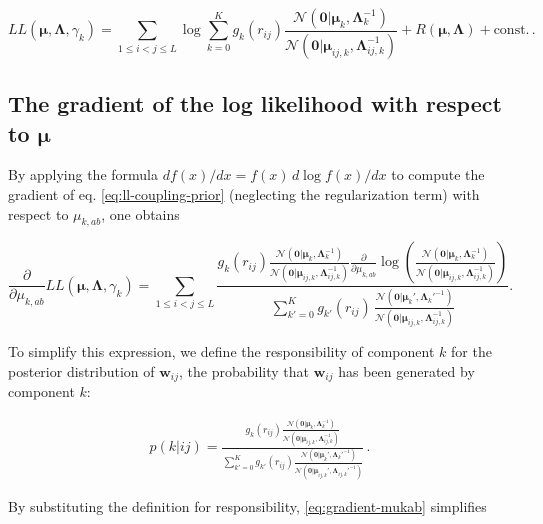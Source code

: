 \documentclass[12pt,a4paper,twoside]{book}
\newcommand{\Gauss}{\mathcal{N}}
\newcommand{\Lijk}{\mathbf{\Lambda}_{ij,k}}
\newcommand{\Lk}{\mathbf{\Lambda}_k}
\newcommand{\muijk}{\mathbf{\mu}_{ij,k}}
\newcommand{\muk}{\mathbf{\mu}_k}
\newcommand{\rij}{r_{ij}}
\newcommand{\wij}{\mathbf{w}_{ij}}
\theoremstyle{definition}
\theoremstyle{definition}
\theoremstyle{remark}
\begin{document}
\begin{equation}
    L\!L(\mathbf{\mu}, \mathbf{\Lambda}, \gamma_k) =  \sum_{1 \le i < j \le L}  \log \sum_{k=0}^K g_{k}(\rij) \frac{\Gauss( \mathbf{0} | \muk, \Lk^{-1})}{\Gauss(\mathbf{0} | \muijk, \Lijk^{-1})}  + R(\mathbf{\mu}, \mathbf{\Lambda}) + \text{const.}\,.
\label{eq:ll-coupling-prior}
\end{equation}

\subsection{\texorpdfstring{The gradient of the log likelihood with
respect to
\(\mathbf{\mu}\)}{The gradient of the log likelihood with respect to \textbackslash{}mathbf\{\textbackslash{}mu\}}}\label{the-gradient-of-the-log-likelihood-with-respect-to-mathbfmu}

By applying the formula \(d f(x) / dx = f(x) \, d \log f(x) / dx\) to
compute the gradient of eq. \eqref{eq:ll-coupling-prior} (neglecting the
regularization term) with respect to \(\mu_{k,ab}\), one obtains

\begin{equation}
 \frac{\partial}{\partial \mu_{k,ab}} L\!L(\mathbf{\mu}, \mathbf{\Lambda}, \gamma_k)
    = \sum_{1\le i<j\le L}  
    \frac{ 
        g_{k}(\rij) \frac{  \Gauss ( \mathbf{0} | \muk, \Lk^{-1})}{\Gauss( \mathbf{0} | \muijk, \Lijk^{-1})} 
             \frac{\partial}{\partial \mu_{k,ab}}  \log \left( \frac{ \Gauss(\mathbf{0} | \muk, \Lk^{-1})}{\Gauss( \mathbf{0} | \muijk, \Lijk^{-1})} \right)  
     } { \sum_{k'=0}^K g_{k'}(\rij) \, \frac{ \Gauss(\mathbf{0} | \muk', \Lk'^{-1})}{\Gauss( \mathbf{0} | \muijk, \Lijk^{-1})}  } .
\label{eq:gradient-mukab}
\end{equation}

To simplify this expression, we define the responsibility of component
\(k\) for the posterior distribution of \(\wij\), the probability that
\(\wij\) has been generated by component \(k\):

\begin{align}
      p(k|ij)  = 
      \frac{ g_{k}(\rij) \frac{ \Gauss( \mathbf{0} | \muk, \Lk^{-1})}{\Gauss(\mathbf{0} | \muijk, \Lijk^{-1})} } 
    {\sum_{k'=0}^K g_{k'}(\rij) \frac{ \Gauss(\mathbf{0} | \muk', \Lk'^{-1})}{\Gauss( \mathbf{0} | \muijk', \Lijk'^{-1})} }  \,.
\label{eq:responsibilities}
\end{align}

By substituting the definition for responsibility,
\eqref{eq:gradient-mukab} simplifies
\end{document}
